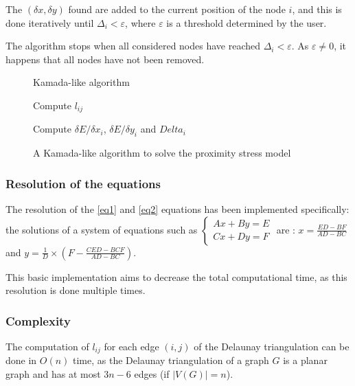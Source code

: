 \documentclass[12pt]{report}
\begin{document}
The $(\delta x, \delta y)$ found are added to the current position of the node $i$, and this is done iteratively until $\Delta_i < \varepsilon$, where $\varepsilon$ is a threshold determined by the user.

The algorithm stops when all considered nodes have reached $\Delta_i < \varepsilon$. As $\varepsilon \neq 0$, it happens that all nodes have not been removed.

\begin{figure}
\begin{algorithm}[H]
\caption{Kamada-like algorithm}
{Compute $l_{ij}$}

{Compute $\delta E / \delta x_i$, $\delta E / \delta y_i$ and $Delta_i$}


\end{algorithm}
\caption{A Kamada-like algorithm to solve the proximity stress model}
\label{algkamada}
\end{figure}

\subsubsection{Resolution of the equations}

The resolution of the \ref{eq1} and \ref{eq2} equations has been implemented specifically: the solutions of a system of equations such as 
$\begin{cases}
Ax + By = E \\
C x + Dy = F
\end{cases}$
are : $x = \frac{ED - BF}{AD - BC}$ and $y = \frac{1}{D} \times(F - \frac{CED - BCF}{AD- BC})$.

This basic implementation aims to decrease the total computational time, as this resolution is done multiple times.

\subsubsection{Complexity}

The computation of $l_{ij}$ for each edge $(i,j)$ of the Delaunay triangulation can be done in $O(n)$ time, as the Delaunay triangulation of a graph $G$ is a planar graph and has at most $3n -6$ edges (if $|V(G)| = n$).
\end{document}
